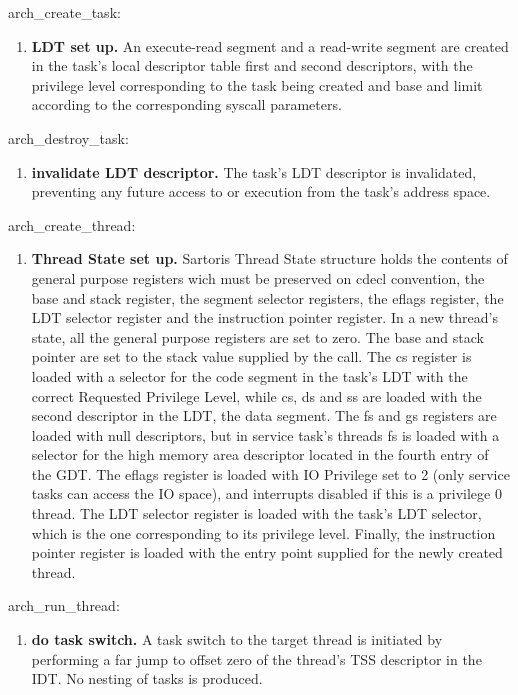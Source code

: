 \documentclass[11pt, letterpaper, twoside, english]{book}
\begin{document}
\textsf{arch\_create\_task}: 
\begin{enumerate}
\item[]\textbf{LDT set up.} An execute-read segment and a read-write segment are created in the task's local descriptor table first and second descriptors, with the privilege level corresponding to the task being created and base and limit according to the corresponding syscall parameters.
\end{enumerate}

\textsf{arch\_destroy\_task}: 
\begin{enumerate}
\item[]\textbf{invalidate LDT descriptor.} The task's LDT descriptor is invalidated, preventing any future access to or execution from the task's address space.
\end{enumerate}

\textsf{arch\_create\_thread}: 
\begin{enumerate}
\item[]\textbf{Thread State set up.} Sartoris Thread State structure holds the contents of general purpose registers wich must be preserved on cdecl convention, the base and stack register, the segment selector registers, the eflags register, the LDT selector register and the instruction pointer register. In a new thread's state, all the general purpose registers are set to zero. The base and stack pointer are set to the stack value supplied by the call. The cs register is loaded with a selector for the code segment in the task's LDT with the correct Requested Privilege Level, while cs, ds and ss are loaded with the second descriptor in the LDT, the data segment. The fs and gs registers are loaded with null descriptors, but in service task's threads fs is loaded with a selector for the high memory area descriptor located in the fourth entry of the GDT. The eflags register is loaded with IO Privilege set to 2 (only service tasks can access the IO space), and interrupts disabled if this is a privilege 0 thread. The LDT selector register is loaded with the task's LDT selector, which is the one corresponding to its privilege level. Finally, the instruction pointer register is loaded with the entry point supplied for the newly created thread.
\end{enumerate}

\textsf{arch\_run\_thread}: 
\begin{enumerate}
\item[]\textbf{do task switch.} A task switch to the target thread is initiated by performing a far jump to offset zero of the thread's TSS descriptor in the IDT. No nesting of tasks is produced.
\end{enumerate}
\end{document}
